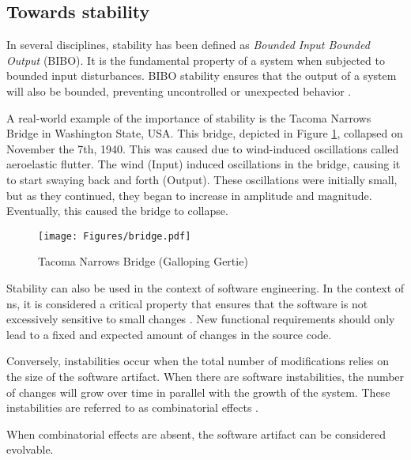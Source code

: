 \subsection{Towards stability} \label{subsec:on_stability}

In several disciplines, stability has been defined as \emph{Bounded Input Bounded Output}
(BIBO). It is the fundamental property of a system when subjected to bounded input
disturbances. BIBO stability ensures that the output of a system will also be bounded,
preventing uncontrolled or unexpected behavior \parencite[270]{mannaert_normalized_2016}. 

A real-world example of the importance of stability is the Tacoma Narrows Bridge in
Washington State, USA. This bridge, depicted in Figure \ref*{fig:bridge}, collapsed on
November the 7th, 1940. This was caused due to wind-induced oscillations called
aeroelastic flutter. The wind (Input) induced oscillations in the bridge, causing it to
start swaying back and forth (Output). These oscillations were initially small, but as
they continued, they began to increase in amplitude and magnitude. Eventually, this 
caused the bridge to collapse.

\begin{figure}[H]
    \centering
    \texttt{[image: Figures/bridge.pdf]}
    \caption[TNB]{Tacoma Narrows Bridge (Galloping Gertie)}
    \label{fig:bridge}
\end{figure}

Stability can also be used in the context of software engineering. In the context of
\gls{ns}, it is considered a critical property that ensures that the software is not
excessively sensitive to small changes \parencite[270]{mannaert_normalized_2016}. New
functional requirements should only lead to a fixed and expected amount of changes in
the source code. 

Conversely, instabilities occur when the total number of modifications relies on the size
of the software artifact. When there are software instabilities, the number of changes
will grow over time in parallel with the growth of the system. These instabilities are
referred to as combinatorial effects \parencite[270]{mannaert_normalized_2016}. 

When combinatorial effects are absent, the software artifact can be considered evolvable.